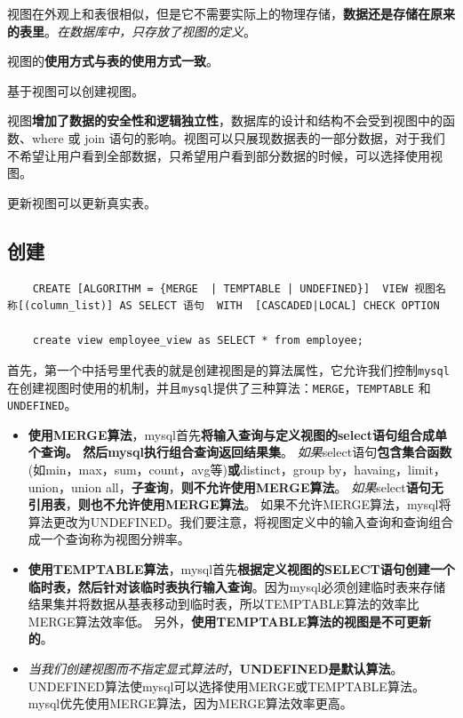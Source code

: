 \documentclass[UTF8,a4paper,12pt]{ctexbook}
\begin{document}
		视图在外观上和表很相似，但是它不需要实际上的物理存储，\textbf{数据还是存储在原来的表里}。\textit{在数据库中，只存放了视图的定义}。
		
		视图的\textbf{使用方式与表的使用方式一致}。
		
		基于视图可以创建视图。
		
		视图\textbf{增加了数据的安全性和逻辑独立性}，数据库的设计和结构不会受到视图中的函数、where 或 join 语句的影响。视图可以只展现数据表的一部分数据，对于我们不希望让用户看到全部数据，只希望用户看到部分数据的时候，可以选择使用视图。
		
		更新视图可以更新真实表。
		
		\subsection{创建}
			\begin{lstlisting}
	CREATE [ALGORITHM = {MERGE  | TEMPTABLE | UNDEFINED}]  VIEW 视图名称[(column_list)] AS SELECT 语句  WITH  [CASCADED|LOCAL] CHECK OPTION
	
	create view employee_view as SELECT * from employee;			
			\end{lstlisting}
			首先，第一个中括号里代表的就是创建视图是的算法属性，它允许我们控制\verb|mysql|在创建视图时使用的机制，并且\verb|mysql|提供了三种算法：\verb|MERGE|，\verb|TEMPTABLE| 和 \verb|UNDEFINED|。	
			
			
			\begin{itemize}
				\item \textbf{使用MERGE算法}，mysql首先\textbf{将输入查询与定义视图的select语句组合成单个查询。 然后mysql执行组合查询返回结果集}。 \textit{如果}select语句\textbf{包含集合函数}(如min，max，sum，count，avg等)\textbf{或}distinct，group by，havaing，limit，union，union all，\textbf{子查询}，\textbf{则不允许使用MERGE算法}。 \textit{如果}select\textbf{语句无引用表}，\textbf{则也不允许使用MERGE算法}。 如果不允许MERGE算法，mysql将算法更改为UNDEFINED。我们要注意，将视图定义中的输入查询和查询组合成一个查询称为视图分辨率。
				
				\item \textbf{使用TEMPTABLE算法}，mysql首先\textbf{根据定义视图的SELECT语句创建一个临时表，然后针对该临时表执行输入查询}。因为mysql必须创建临时表来存储结果集并将数据从基表移动到临时表，所以TEMPTABLE算法的效率比MERGE算法效率低。 另外，\textbf{使用TEMPTABLE算法的视图是不可更新的}。
				
				\item \textit{当我们创建视图而不指定显式算法时}，\textbf{UNDEFINED是默认算法}。 UNDEFINED算法使mysql可以选择使用MERGE或TEMPTABLE算法。mysql优先使用MERGE算法，因为MERGE算法效率更高。
			\end{itemize}
			
\end{document}
